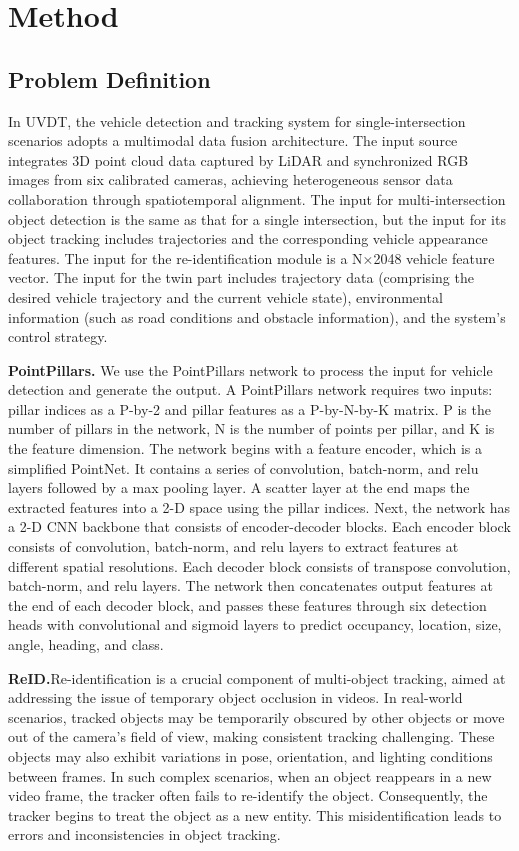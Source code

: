 \documentclass[lettersize,journal]{IEEEtran}
\begin{document}
\section{Method}

\subsection{Problem Definition}

In UVDT, the vehicle detection and tracking system for single-intersection scenarios adopts a multimodal data fusion architecture.
The input source integrates 3D point cloud data captured by LiDAR and synchronized RGB images from six calibrated cameras, achieving heterogeneous sensor data collaboration through spatiotemporal alignment.
The input for multi-intersection object detection is the same as that for a single intersection, but the input for its object tracking includes trajectories and the corresponding vehicle appearance features. 
The input for the re-identification module is a N×2048 vehicle feature vector. 
The input for the twin part includes trajectory data (comprising the desired vehicle trajectory and the current vehicle state), environmental information (such as road conditions and obstacle information), and the system's control strategy.

\textbf{PointPillars.}
We use the PointPillars network to process the input for vehicle detection and generate the output.
A PointPillars network requires two inputs: pillar indices as a P-by-2 and pillar features as a P-by-N-by-K matrix. P is the number of pillars in the network, N is the number of points per pillar, and K is the feature dimension.
The network begins with a feature encoder, which is a simplified PointNet. It contains a series of convolution, batch-norm, and relu layers followed by a max pooling layer. A scatter layer at the end maps the extracted features into a 2-D space using the pillar indices.
Next, the network has a 2-D CNN backbone that consists of encoder-decoder blocks. Each encoder block consists of convolution, batch-norm, and relu layers to extract features at different spatial resolutions. Each decoder block consists of transpose convolution, batch-norm, and relu layers.
The network then concatenates output features at the end of each decoder block, and passes these features through six detection heads with convolutional and sigmoid layers to predict occupancy, location, size, angle, heading, and class.

\textbf{ReID.}Re-identification is a crucial component of multi-object tracking, aimed at addressing the issue of temporary object occlusion in videos. 
In real-world scenarios, tracked objects may be temporarily obscured by other objects or move out of the camera's field of view, making consistent tracking challenging. 
These objects may also exhibit variations in pose, orientation, and lighting conditions between frames. 
In such complex scenarios, when an object reappears in a new video frame, the tracker often fails to re-identify the object. 
Consequently, the tracker begins to treat the object as a new entity. 
This misidentification leads to errors and inconsistencies in object tracking.
\end{document}
